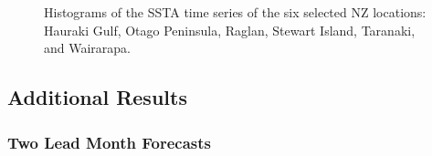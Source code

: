 \documentclass[11pt, a4paper]{article}
\begin{document}
\begin{figure}[H]
\centering
{}
\\
\\
\caption{Histograms of the SSTA time series of the six selected NZ locations: Hauraki Gulf, Otago Peninsula, Raglan, Stewart Island, Taranaki, and Wairarapa.}
\end{figure}

\subsection{Additional Results}\label{apd:add}

\subsubsection{Two Lead Month Forecasts}\label{apd:two}
\end{document}
